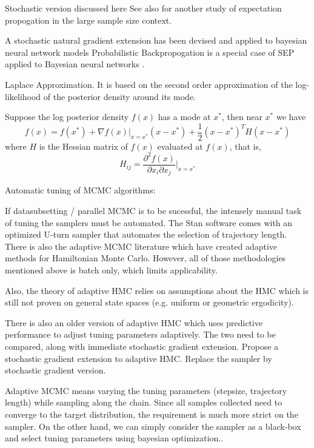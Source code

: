 \documentclass{book}
\begin{document}
\begin{enumerate}
Stochastic version discussed here \cite{li2015stochastic}
See also \cite{dehaene2015expectation} for another study of expectation propogation in the large sample size context. 

A stochastic natural gradient extension has been devised and applied to bayesian neural network models \cite{teh2015distributed}
Probabilistic Backpropogation is a special case of SEP applied to Bayesian neural networks \cite{hernandez2015probabilistic}.


Laplace Approximation. It is based on the second order approximation of the
log-likelihood of the posterior density around its mode.

Suppose the log posterior density $f(x)$ has a mode at $x^*$, then near $x^*$ we
have 
\[ f(x) = f(x^*) + \nabla f(x)|_{x=x^*} (x-x^*) + \frac{1}{2} (x-x^*)^TH(x-x^*)
\]
where $H$ is the Hessian matrix of $f(x)$ evaluated at $f(x)$, that is,
\[ H_{ij} = \frac{\partial^2 f(x)}{\partial x_i \partial x_j }|_{x=x^*} \]

Automatic tuning of MCMC algorithms:

If datasubsetting / parallel MCMC is to be sucessful, the intensely manual task
of tuning the samplers must be automated. The Stan software comes with an
optimized U-turn sampler \cite{hoffman2014no} that automates the selection of trajectory length. There is also the adaptive MCMC literature which have created adaptive methods for Hamiltonian Monte Carlo. However, all of those methodologies mentioned above is batch only, which limits applicability. 

Also, the theory of adaptive HMC relies on assumptions about the HMC which is still not proven on general state spaces (e.g. uniform or geometric ergodicity).

There is also an older version of adaptive HMC which uses predictive performance to adjust tuning parameters adaptively. The two need to be compared, along with immediate stochastic gradient extension. 
Propose a stochastic gradient extension to adaptive HMC. Replace the sampler by stochastic gradient version.  

Adaptive MCMC means varying the tuning parameters (stepsize, trajectory length)
while sampling along the chain. Since all samples collected need to converge to
the target distribution, the requirement is much more strict on the sampler.
On the other hand, we can simply consider the sampler as a black-box and select
tuning parameters using bayesian optimization.\cite{snoek2012practical}.


\end{enumerate}
\end{document}
